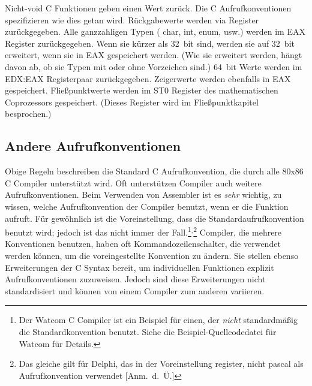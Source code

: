 Nicht-void C Funktionen geben einen Wert zur\"{u}ck. Die C
Aufrufkonventionen spezifizieren wie dies getan wird. R\"{u}ckgabewerte
werden via Register zur\"{u}ckgegeben. Alle ganzzahligen Typen  ({\code
char}, {\code int}, {\code enum}, usw.) werden im EAX Register
zur\"{u}ckgegeben. Wenn sie k\"{u}rzer als 32~bit sind, werden sie auf
32~bit erweitert, wenn sie in EAX gespeichert werden. (Wie sie
erweitert werden, h\"{a}ngt davon ab, ob sie Typen mit oder ohne
Vorzeichen sind.) 64~bit Werte werden im EDX:EAX
 Registerpaar zur\"{u}ckgegeben. Zeigerwerte
werden ebenfalls in EAX gespeichert. Flie{\ss}punktwerte werden im ST0
Register des mathematischen Coprozessors gespeichert. (Dieses
Register wird im Flie{\ss}punktkapitel besprochen.)


\subsection{Andere Aufrufkonventionen}

Obige Regeln beschreiben die Standard C Aufrufkonvention, die durch
alle 80x86 C Compiler unterst\"{u}tzt wird. Oft unterst\"{u}tzen Compiler
auch weitere Aufrufkonventionen. Beim Verwenden von Assembler ist es
\emph{sehr} wichtig, zu wissen, welche Aufrufkonvention der Compiler
benutzt, wenn er die Funktion aufruft. F\"{u}r gew\"{o}hnlich ist die
Voreinstellung, dass die Standardaufrufkonvention benutzt wird;
jedoch ist das nicht immer der Fall.\footnote{Der Watcom C
 Compiler ist ein Beispiel f\"{u}r einen, der
\emph{nicht} standardm\"{a}{\ss}ig die Standardkonvention benutzt. Siehe die
Beispiel-Quellcodedatei f\"{u}r Watcom f\"{u}r Details.}$^{,}$\footnote{Das
gleiche gilt f\"{u}r Delphi,  das in der
Voreinstellung {\code register}, 
nicht {\code pascal}  als
Aufrufkonvention verwendet [Anm.\ d.\ \"{U}\@.]} Compiler, die mehrere
Konventionen benutzen, haben oft Kommandozeilenschalter, die
verwendet werden k\"{o}nnen, um die voreingestellte Konvention zu
\"{a}ndern. Sie stellen ebenso Erweiterungen der C Syntax bereit, um
individuellen Funktionen explizit Aufrufkonventionen zuzuweisen.
Jedoch sind diese Erweiterungen nicht standardisiert und k\"{o}nnen von
einem Compiler zum anderen variieren.

